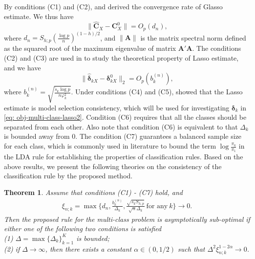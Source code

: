 \documentclass[12pt]{article}
\newtheorem{theorem}{Theorem}%
\begin{document}
By conditions (C1) and (C2), \cite{rothman2008sparse} and \cite{lam2009sparsistency}
derived the convergence rate of Glasso estimate.
We thus have
\begin{equation}\label{conrateC}
\| \hat{\bm C}_X - \bm C_X^0 \| = O_p(d_n),
\end{equation}
where $d_n = S_{h;p} (\frac{\log p}{n})^{(1-h)/2}$, and $\|\bm A\|$ is the matrix spectral norm
defined as the squared root of the maximum eigenvalue of matrix $\bm A' \bm A$.
The conditions (C2) and (C3) are used in \cite{B2011Statistics} to study the theoretical property of Lasso estimate, and we have
\begin{equation}\label{conratedelta}
\| \hat{\bm \delta}_{kX} - \bm \delta_{kX}^0 \|_2 = O_p(b_k^{(n)}),
\end{equation}
where $b_k^{(n)}= \sqrt{\frac{\tilde{s}_k \log p}{n \varphi_k^2}}$.
Under conditions (C4) and (C5), \cite{zhao2006on} showed that the Lasso estimate is model selection consistency,
which will be used for investigating $\bm \delta_{k}$ in \eqref{eq: obj-multi-class-lasso2}.
Condition (C6) requires that all the classes should be separated from each other. %
Also note that condition (C6) is equivalent to that $\Delta_k$ is bounded away from 0.
The condition (C7) guarantees a balanced sample size for each class, which is commonly used in literature to bound the term $\log \frac{\pi_k}{\pi_1}$ in the LDA rule for establishing the properties of classification rules.
Based on the above results, we present the following theories on the consistency of the classification rule by the proposed method.



\begin{theorem}{}{\label{theory:multiclass}}
Assume that conditions (C1) - (C7) hold, and
\begin{align*}
\xi_{n;k} = \max \{ d_n, \frac{b_k^{(n)}}{\Delta_k}, \frac{\sqrt{s_k S_{h;p}}}{\sqrt{n} \Delta_k} ~\mbox{for any}~k \} \rightarrow 0.
\end{align*}
Then the proposed rule for the multi-class problem is asymptotically sub-optimal if either one of the following two conditions is satisfied  \\
(1) $\Delta = \max \{ \Delta_k \}_{k=1}^K$ is bounded; \\
(2) if $\Delta \rightarrow \infty$, then there exists a constant $\alpha \in (0, 1/2)$  such that $\Delta^2 \xi_{n;k}^{1-2 \alpha} \rightarrow 0$.
\end{theorem}
\end{document}
